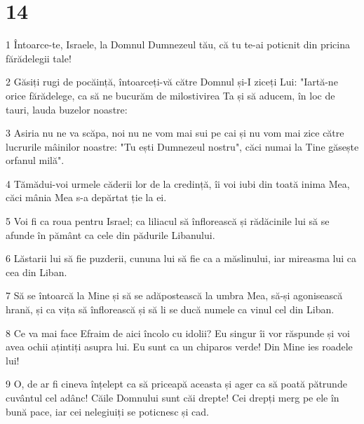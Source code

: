 \chapter{14}

\par 1 Întoarce-te, Israele, la Domnul Dumnezeul tău, că tu te-ai poticnit din pricina fărădelegii tale!
\par 2 Găsiți rugi de pocăință, întoarceți-vă către Domnul și-I ziceți Lui: "Iartă-ne orice fărădelege, ca să ne bucurăm de milostivirea Ta și să aducem, în loc de tauri, lauda buzelor noastre:
\par 3 Asiria nu ne va scăpa, noi nu ne vom mai sui pe cai și nu vom mai zice către lucrurile mâinilor noastre: "Tu ești Dumnezeul nostru", căci numai la Tine găsește orfanul milă".
\par 4 Tămădui-voi urmele căderii lor de la credință, îi voi iubi din toată inima Mea, căci mânia Mea s-a depărtat ție la ei.
\par 5 Voi fi ca roua pentru Israel; ca liliacul să înflorească și rădăcinile lui să se afunde în pământ ca cele din pădurile Libanului.
\par 6 Lăstarii lui să fie puzderii, cununa lui să fie ca a măslinului, iar mireasma lui ca cea din Liban.
\par 7 Să se întoarcă la Mine și să se adăpostească la umbra Mea, să-și agonisească hrană, și ca vița să înflorească și să li se ducă numele ca vinul cel din Liban.
\par 8 Ce va mai face Efraim de aici încolo cu idolii? Eu singur îi vor răspunde și voi avea ochii ațintiți asupra lui. Eu sunt ca un chiparos verde! Din Mine ies roadele lui!
\par 9 O, de ar fi cineva înțelept ca să priceapă aceasta și ager ca să poată pătrunde cuvântul cel adânc! Căile Domnului sunt căi drepte! Cei drepți merg pe ele în bună pace, iar cei nelegiuiți se poticnesc și cad.


